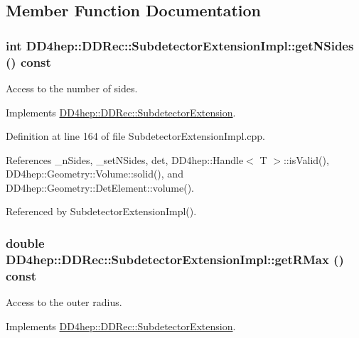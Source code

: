 \subsection{Member Function Documentation}
\hypertarget{class_d_d4hep_1_1_d_d_rec_1_1_subdetector_extension_impl_ac5bedd13a416dcf18730ce3eb23e2ee0}{
\subsubsection[{getNSides}]{\setlength{\rightskip}{0pt plus 5cm}int DD4hep::DDRec::SubdetectorExtensionImpl::getNSides () const}}
\label{class_d_d4hep_1_1_d_d_rec_1_1_subdetector_extension_impl_ac5bedd13a416dcf18730ce3eb23e2ee0}


Access to the number of sides. 

Implements \hyperlink{class_d_d4hep_1_1_d_d_rec_1_1_subdetector_extension_a7bed401e919e8eaaf2dfdf8fe89a3697}{DD4hep::DDRec::SubdetectorExtension}.

Definition at line 164 of file SubdetectorExtensionImpl.cpp.

References \_\-nSides, \_\-setNSides, det, DD4hep::Handle$<$ T $>$::isValid(), DD4hep::Geometry::Volume::solid(), and DD4hep::Geometry::DetElement::volume().

Referenced by SubdetectorExtensionImpl().\hypertarget{class_d_d4hep_1_1_d_d_rec_1_1_subdetector_extension_impl_a2d3822620caa0a681d124f2219c6e451}{
\subsubsection[{getRMax}]{\setlength{\rightskip}{0pt plus 5cm}double DD4hep::DDRec::SubdetectorExtensionImpl::getRMax () const}}
\label{class_d_d4hep_1_1_d_d_rec_1_1_subdetector_extension_impl_a2d3822620caa0a681d124f2219c6e451}


Access to the outer radius. 

Implements \hyperlink{class_d_d4hep_1_1_d_d_rec_1_1_subdetector_extension_a6d7b6e1818a7ca5054279ea5d372b7f4}{DD4hep::DDRec::SubdetectorExtension}.

